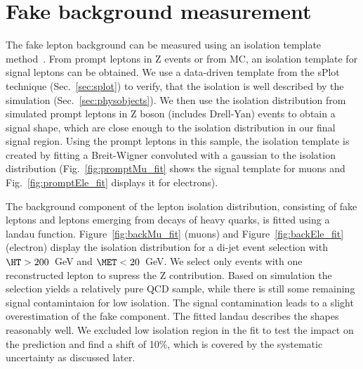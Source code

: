 \section{Fake background measurement}\label{sec:fakes}

The fake lepton background can be measured using an isolation template method~\cite{suspas10001}. From prompt leptons in Z events or from MC, an isolation template for signal leptons can be obtained. We use a data-driven template from the sPlot technique (Sec.~\ref{sec:splot}) to verify, that the isolation is well described by the simulation (Sec.~\ref{sec:physobjects}).
We then use the isolation distribution from simulated prompt leptons in Z boson (includes Drell-Yan) events 
to obtain a signal shape, which are close enough to the isolation distribution in our final signal region.
Using the prompt leptons in this sample, the isolation template is created by fitting a Breit-Wigner convoluted with a gaussian to the isolation distribution (Fig.~\ref{fig:promptMu_fit} shows the signal template for muons and Fig.~\ref{fig:promptEle_fit} displays it for electrons). 

The background component of the lepton isolation distribution, consisting of fake leptons and leptons emerging from decays of heavy quarks, is fitted using a landau function. Figure~\ref{fig:backMu_fit} (muons) and Figure~\ref{fig:backEle_fit} (electron) display the isolation distribution for a di-jet event selection with $\HT > 200$~GeV and $\MET < 20$~GeV. We select only events with one reconstructed lepton to supress the Z contribution. Based on simulation the selection yields a relatively pure QCD sample, while there is still some remaining signal contamintaion for low isolation. The signal contamination leads to a slight overestimation of the fake component. The fitted landau describes the shapes reasonably well. We excluded low isolation region in the fit to test the impact on the prediction and find a shift of 10\%, which is covered by the systematic uncertainty as discussed later.


